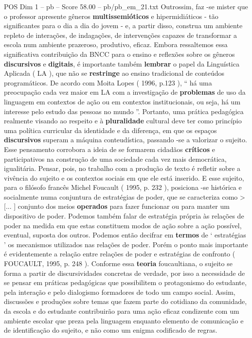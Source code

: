 \begin{textsample}{POS Dim 1 – pb – Score 58.00 – pb/pb\_em\_21.txt}
Outrossim, faz -se mister que o professor apresente gêneros \textbf{multissemióticos} e hipermidiáticos - tão significantes para o dia a dia do jovem - e, a partir disso, construa um ambiente repleto de interações, de indagações, de intervenções capazes de transformar a escola num ambiente prazeroso, produtivo, eficaz.
Embora ressaltemos essa significativa contribuição da BNCC para o ensino e reflexões sobre os gêneros \textbf{discursivos} e \textbf{digitais}, é importante também \textbf{lembrar} o papel da Linguística Aplicada ( LA ), que não se \textbf{restringe} ao ensino tradicional de conteúdos programáticos.
De acordo com Moita Lopes ( 1996, p.123 ), “ há uma preocupação cada vez maior em LA com a investigação de \textbf{problemas} de uso da linguagem em contextos de ação ou em contextos institucionais, ou seja, há um interesse pelo estudo das pessoas no mundo ”.
Portanto, uma prática pedagógica realmente visando ao respeito e à \textbf{pluralidade} cultural deve ter como princípio uma política curricular da identidade e da diferença, em que os espaços \textbf{discursivos} superam a máquina conteudística, passando -se a valorizar o sujeito.
Esse pensamento corrobora a ideia de se formarem cidadãos \textbf{críticos} e participativos na construção de uma sociedade cada vez mais democrática, igualitária.
Pensar, pois, no trabalho com a produção de texto é refletir sobre a vivência do sujeito e os contextos sociais em que ele está inserido.
E esse sujeito, para o filósofo francês Michel Foucault ( 1995, p. 232 ), posiciona -se histórica e socialmente numa conjuntura de estratégias de poder, que se caracteriza como > [... ] conjunto dos meios \textbf{operados} para fazer funcionar ou para manter um dispositivo de poder.
Podemos também falar de estratégia própria às relações de poder na medida em que estas constituem modos de ação sobre a ação possível, eventual, suposta dos outros.
Podemos então decifrar em \textbf{termos} de ‘ estratégias ’ os mecanismos utilizados nas relações de poder.
Porém o ponto mais importante é evidentemente a relação entre relações de poder e estratégias de confronto ( FOUCAULT, 1995, p. 248 ).
Conforme essa \textbf{teoria} foucaultiana, o sujeito se forma a partir de discursividades concretas de verdade, por isso a necessidade de se pensar em práticas pedagógicas que possibilitem o protagonismo do estudante, pela interação e pelo dialogismo formadores de todo um campo social.
Assim, discussões e produções sobre temas que fazem parte do cotidiano da comunidade, da escola e do estudante contribuirão para uma ação eficaz condizente com um ambiente escolar que preza pela linguagem enquanto elemento de comunicação e de identificação do sujeito, e não como um enigma codificado de regras.

\end{textsample}
